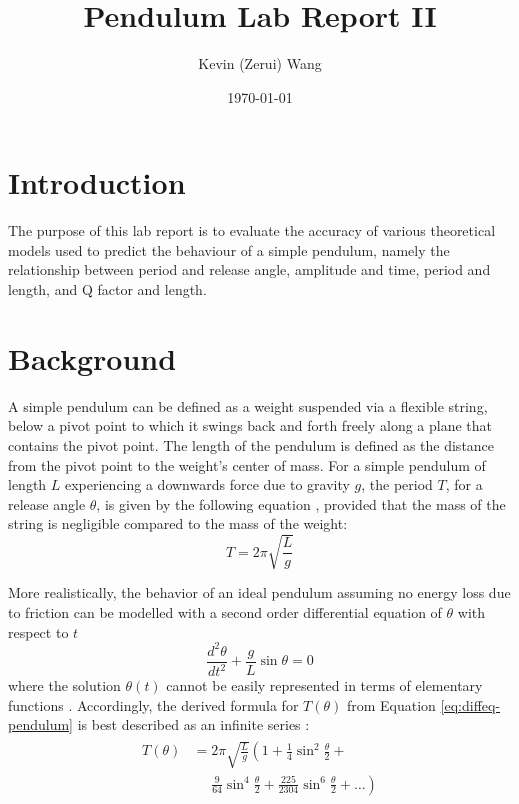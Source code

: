 \documentclass[12pt]{article}
\title{Pendulum Lab Report II}
\author{Kevin (Zerui) Wang}
\date{\today}
\begin{document}
\maketitle
\tableofcontents
\newpage


\section{Introduction}
{\color{blue}The purpose of this lab report is to evaluate the accuracy of various theoretical models used to predict the behaviour of a simple pendulum, namely the relationship between period and release angle, amplitude and time, period and length, and Q factor and length.}

\section{Background} \label{Background}
A simple pendulum can be defined as a weight suspended via a flexible string, below a pivot point to which it swings back and forth freely along a plane that contains the pivot point. The length of the pendulum is defined as the distance from the pivot point to the weight's center of mass. For a simple pendulum of length $L$ experiencing a downwards force due to gravity $g$, the period $T$, for a release angle $\theta$, is given by the following equation \cite{the-simple-pendulum}, provided that the mass of the string is negligible compared to the mass of the weight:
\begin{equation} \label{eq:l-over-g}
    T = 2\pi \sqrt{\frac{L}{g}}
\end{equation}



More realistically, the behavior of an ideal pendulum assuming no energy loss due to friction can be modelled with a second order differential equation of $\theta$ with respect to $t$
\begin{equation} \label{eq:diffeq-pendulum}
    \frac{d^2\theta}{dt^2} + \frac{g}{L}\sin{\theta} = 0
\end{equation}
where the solution $\theta(t)$ cannot be easily represented in terms of elementary functions \cite{no-elementary-fns}. Accordingly, the derived formula for $T(\theta)$ from Equation \ref{eq:diffeq-pendulum} is best described as an infinite series \cite{no-elementary-fns-2}:
\begin{align} \label{eq:power-series-derived}
\begin{split}
    T(\theta) &= 2\pi\sqrt{\frac{L}{g}} \left(1 + \frac{1}{4}\sin^2\frac{\theta}{2} \right. + \\
    &\phantom{{}=}\left. \frac{9}{64}\sin^4\frac{\theta}{2} + \frac{225}{2304}\sin^6\frac{\theta}{2} + \ldots \right)
\end{split}
\end{align}
\end{document}
